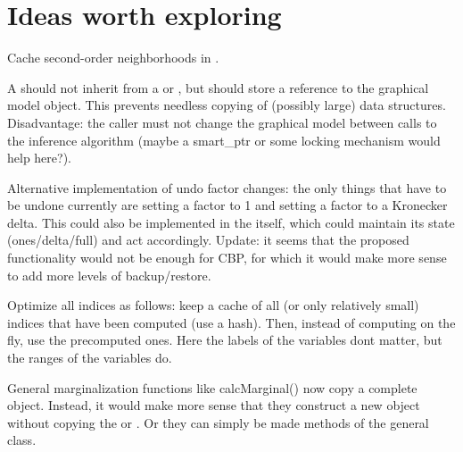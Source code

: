 \chapter{Ideas worth exploring}
\hypertarget{ideas}{}\label{ideas}

\begin{DoxyRefList}
\item[Class \doxylink{classdai_1_1BipartiteGraph}{dai\+::Bipartite\+Graph} ]\label{ideas__ideas000001}%
%
 Cache second-\/order neighborhoods in .  
\item[Class \doxylink{classdai_1_1DAIAlg}{dai\+::DAIAlg\texorpdfstring{$<$}{<} GRM \texorpdfstring{$>$}{>}} ]\label{ideas__ideas000003}%
%
 A  should not inherit from a  or , but should store a reference to the graphical model object. This prevents needless copying of (possibly large) data structures. Disadvantage\+: the caller must not change the graphical model between calls to the inference algorithm (maybe a smart\+\_\+ptr or some locking mechanism would help here?).  
\item[Class \doxylink{classdai_1_1FactorGraph}{dai\+::Factor\+Graph} ]\label{ideas__ideas000004}%
%
 Alternative implementation of undo factor changes\+: the only things that have to be undone currently are setting a factor to 1 and setting a factor to a Kronecker delta. This could also be implemented in the  itself, which could maintain its state (ones/delta/full) and act accordingly. Update\+: it seems that the proposed functionality would not be enough for CBP, for which it would make more sense to add more levels of backup/restore. 
\item[Class \doxylink{classdai_1_1IndexFor}{dai\+::Index\+For} ]\label{ideas__ideas000005}%
%
 Optimize all indices as follows\+: keep a cache of all (or only relatively small) indices that have been computed (use a hash). Then, instead of computing on the fly, use the precomputed ones. Here the labels of the variables don\textquotesingle{}t matter, but the ranges of the variables do.  
\item[Class \doxylink{classdai_1_1InfAlg}{dai\+::Inf\+Alg} ]\label{ideas__ideas000002}%
%
 General marginalization functions like calc\+Marginal() now copy a complete  object. Instead, it would make more sense that they construct a new object without copying the  or . Or they can simply be made methods of the general  class. 




\end{DoxyRefList}
